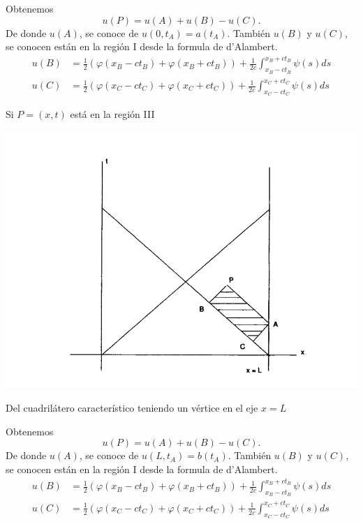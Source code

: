 \documentclass[11pt]{book}
\theoremstyle{plain}
\theoremstyle{definition}
\begin{document}
Obtenemos 
\[
u(P) = u(A) + u(B) - u(C)
.\]
De donde $u(A)$, se conoce de $u(0,t_{A}) = a(t_{A})$. 
También $u(B)$ y $u(C)$, se conocen están en la región I desde la formula de d'Alambert.
\begin{align*}
    u(B) &= \frac{1}{2}\left( \varphi(x_{B} - ct_{B}) +  \varphi(x_{B} + ct_{B}) \right) + \frac{1}{2c} \int_{x_{B}-ct_{B}}^{x_{B}+ct_{B}} \psi(s)ds\\
    u(C) &= \frac{1}{2}\left( \varphi(x_{C} - ct_{C}) +  \varphi(x_{C} + ct_{C}) \right) + \frac{1}{2c} \int_{x_{C}-ct_{C}}^{x_{C}+ct_{C}} \psi(s)ds
\end{align*}

Si $P = (x,t)$ está en la región III 
\begin{center}
    \includegraphics[scale=0.2]{RegionIII.png}
\end{center}
Del cuadrilátero característico teniendo un vértice en el eje $x=L$

Obtenemos 
\[
u(P) = u(A) + u(B) - u(C)
.\]
De donde $u(A)$, se conoce de $u(L,t_{A}) = b(t_{A})$. 
También $u(B)$ y $u(C)$, se conocen están en la región I desde la formula de d'Alambert.
\begin{align*}
    u(B) &= \frac{1}{2}\left( \varphi(x_{B} - ct_{B}) +  \varphi(x_{B} + ct_{B}) \right) + \frac{1}{2c} \int_{x_{B}-ct_{B}}^{x_{B}+ct_{B}} \psi(s)ds\\
    u(C) &= \frac{1}{2}\left( \varphi(x_{C} - ct_{C}) +  \varphi(x_{C} + ct_{C}) \right) + \frac{1}{2c} \int_{x_{C}-ct_{C}}^{x_{C}+ct_{C}} \psi(s)ds
\end{align*}
\end{document}
